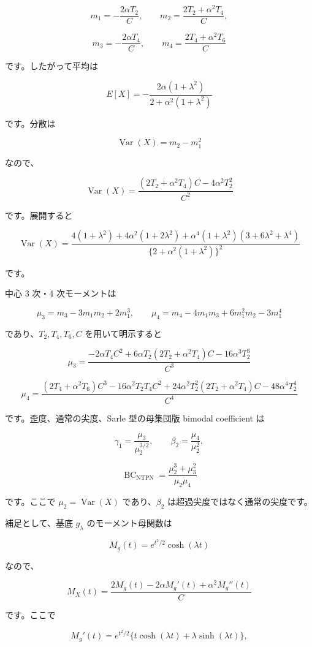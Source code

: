 \documentclass[
]{article}
\begin{document}
\[
m_1=-\frac{2\alpha T_2}{C},
\qquad
m_2=\frac{2T_2+\alpha^2T_4}{C},
\]

\[
m_3=-\frac{2\alpha T_4}{C},
\qquad
m_4=\frac{2T_4+\alpha^2T_6}{C}
\]

です。したがって平均は

\[
\boxed{
E[X]
=
-\frac{2\alpha(1+\lambda^2)}
{2+\alpha^2(1+\lambda^2)}
}
\]

です。分散は

\[
\operatorname{Var}(X)=m_2-m_1^2
\]

なので、

\[
\boxed{
\operatorname{Var}(X)
=
\frac{
(2T_2+\alpha^2T_4)C-4\alpha^2T_2^2
}{C^2}
}
\]

です。展開すると

\[
\operatorname{Var}(X)
=
\frac{
4(1+\lambda^2)
+
4\alpha^2(1+2\lambda^2)
+
\alpha^4(1+\lambda^2)(3+6\lambda^2+\lambda^4)
}{
\{2+\alpha^2(1+\lambda^2)\}^2
}
\]

です。

中心 3 次・4 次モーメントは

\[
\mu_3=m_3-3m_1m_2+2m_1^3,
\qquad
\mu_4=m_4-4m_1m_3+6m_1^2m_2-3m_1^4
\]

であり、\(T_2,T_4,T_6,C\) を用いて明示すると

\[
\mu_3
=
\frac{
-2\alpha T_4C^2
+
6\alpha T_2(2T_2+\alpha^2T_4)C
-
16\alpha^3T_2^3
}{C^3}
\]

\[
\mu_4
=
\frac{
(2T_4+\alpha^2T_6)C^3
-
16\alpha^2T_2T_4C^2
+
24\alpha^2T_2^2(2T_2+\alpha^2T_4)C
-
48\alpha^4T_2^4
}{C^4}
\]

です。歪度、通常の尖度、Sarle 型の母集団版 bimodal coefficient は

\[
\gamma_1=\frac{\mu_3}{\mu_2^{3/2}},
\qquad
\beta_2=\frac{\mu_4}{\mu_2^2},
\]

\[
\boxed{
\operatorname{BC}_{\mathrm{NTPN}}
=\frac{\mu_2^3+\mu_3^2}{\mu_2\mu_4}
}
\]

です。ここで \(\mu_2=\operatorname{Var}(X)\) であり、\(\beta_2\)
は超過尖度ではなく通常の尖度です。

補足として、基底 \(g_\lambda\) のモーメント母関数は

\[
M_g(t)=e^{t^2/2}\cosh(\lambda t)
\]

なので、

\[
\boxed{
M_X(t)=
\frac{2M_g(t)-2\alpha M_g'(t)+\alpha^2M_g''(t)}{C}
}
\]

です。ここで

\[
M_g'(t)=e^{t^2/2}
\{t\cosh(\lambda t)+\lambda\sinh(\lambda t)\},
\]
\end{document}
